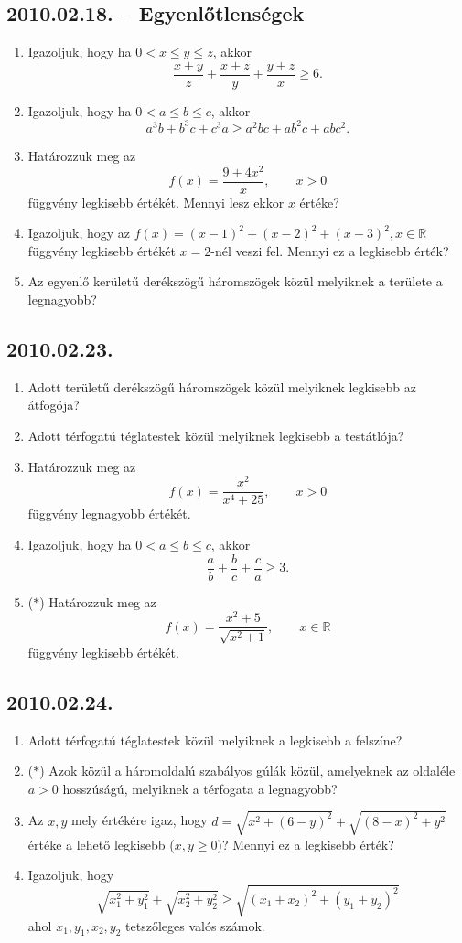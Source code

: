 \subsection*{2010.02.18. -- Egyenlőtlenségek}
\begin{enumerate}
\item Igazoljuk, hogy ha $0<x\le y\le z$, akkor
$$\dfrac{x+y}{z}+\dfrac{x+z}{y}+\dfrac{y+z}{x}\ge 6.$$
\item Igazoljuk, hogy ha $0<a\le b\le c$, akkor
$$a^3b+b^3c+c^3a\ge a^2bc+ab^2c+abc^2.$$
\item Határozzuk meg az
$$f(x)=\dfrac{9+4x^2}{x},\qquad x>0$$
függvény legkisebb értékét. Mennyi lesz ekkor $x$ értéke?
\item Igazoljuk, hogy az $f(x)=(x-1)^2+(x-2)^2+(x-3)^2, x\in\mathbb{R}$
függvény legkisebb értékét $x=2$-nél veszi fel. Mennyi ez a legkisebb érték?
\item Az egyenlő kerületű derékszögű háromszögek közül melyiknek a területe a 
legnagyobb?
\end{enumerate}

\subsection*{2010.02.23.}
\begin{enumerate}
\item Adott területű derékszögű háromszögek közül melyiknek legkisebb az átfogója?
\item Adott térfogatú téglatestek közül melyiknek legkisebb a testátlója?
\item Határozzuk meg az
$$f(x)=\dfrac{x^2}{x^4+25},\qquad x>0$$
függvény legnagyobb értékét.
\item Igazoljuk, hogy ha $0<a\le b\le c$, akkor
$$\dfrac{a}{b}+\dfrac{b}{c}+\dfrac{c}{a}\ge 3.$$
\item ($*$) Határozzuk meg az
$$f(x)=\dfrac{x^2+5}{\sqrt{x^2+1}},\qquad x\in\mathbb{R}$$
függvény legkisebb értékét.
\end{enumerate}

\subsection*{2010.02.24.}
\begin{enumerate}
\item Adott térfogatú téglatestek közül melyiknek a legkisebb a felszíne?
\item ($*$) Azok közül a háromoldalú szabályos gúlák közül, amelyeknek az oldaléle $a>0$ hosszúságú, melyiknek a térfogata a legnagyobb?
\item Az $x,y$ mely értékére igaz, hogy $d=\sqrt{x^2+(6-y)^2}+\sqrt{(8-x)^2+y^2}$
értéke a lehető legkisebb ($x,y\ge 0$)? Mennyi ez a legkisebb érték?
\item Igazoljuk, hogy
$$\sqrt{x_1^2+y_1^2}+\sqrt{x_2^2+y_2^2}\ge \sqrt{(x_1+x_2)^2+(y_1+y_2)^2}$$
ahol $x_1,y_1,x_2,y_2$ tetszőleges valós számok.
\end{enumerate}

